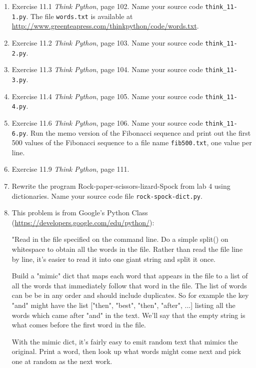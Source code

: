 \documentclass[12pt]{article}
\begin{document}
\begin{enumerate}
       \item Exercise 11.1 \emph{Think Python}, page 102. Name your source code \texttt{think\_11-1.py}. The file \texttt{words.txt} is available at \url{http://www.greenteapress.com/thinkpython/code/words.txt}.
        

       \item Exercise 11.2 \emph{Think Python}, page 103. Name your source code \texttt{think\_11-2.py}.

       \item Exercise 11.3 \emph{Think Python}, page 104. Name your source code \texttt{think\_11-3.py}.


       \item Exercise 11.4 \emph{Think Python}, page 105. Name your source code \texttt{think\_11-4.py}.


       \item Exercise 11.6 \emph{Think Python}, page 106. Name your source code \texttt{think\_11-6.py}. Run the memo version of the Fibonacci sequence and print out the first 500 values of the Fibonacci sequence to a file name \texttt{fib500.txt}, one value per line.  

        \item Exercise 11.9 \emph{Think Python}, page 111.

        \item Rewrite the program Rock-paper-scissors-lizard-Spock from lab 4 using dictionaries. Name your source code file \texttt{rock-spock-dict.py}.

        \item This problem is from Google's Python Class (\url{https://developers.google.com/edu/python/}):

"Read in the file specified on the command line.
Do a simple split() on whitespace to obtain all the words in the file.
Rather than read the file line by line, it's easier to read
it into one giant string and split it once.

Build a "mimic" dict that maps each word that appears in the file
to a list of all the words that immediately follow that word in the file.
The list of words can be be in any order and should include
duplicates. So for example the key "and" might have the list
["then", "best", "then", "after", ...] listing
all the words which came after "and" in the text.
We'll say that the empty string is what comes before
the first word in the file.

With the mimic dict, it's fairly easy to emit random
text that mimics the original. Print a word, then look
up what words might come next and pick one at random as
the next work.


\end{enumerate}
\end{document}
